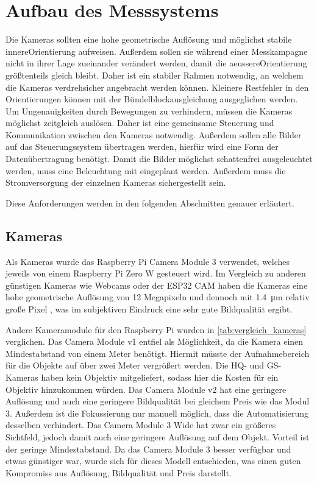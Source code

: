 \documentclass[./00PhotoBox.tex]{subfiles}
\begin{document}
\chapter{Aufbau des Messsystems}
Die Kameras sollten eine hohe geometrische Auflösung und möglichst stabile \gls{innereOrientierung} aufweisen. Außerdem sollen sie während einer Messkampagne nicht in ihrer Lage zueinander verändert werden, damit die \gls{aeussereOrientierung} größtenteils gleich bleibt. Daher ist ein stabiler Rahmen notwendig, an welchem die Kameras verdrehsicher angebracht werden können. Kleinere Restfehler in den Orientierungen können mit der Bündelblockausgleichung ausgeglichen werden.
Um Ungenauigkeiten durch Bewegungen zu verhindern, müssen die Kameras möglichst zeitgleich auslösen. Daher ist eine gemeinsame Steuerung und Kommunikation zwischen den Kameras notwendig. Außerdem sollen alle Bilder auf das Steuerungssystem übertragen werden, hierfür wird eine Form der Datenübertragung benötigt. Damit die Bilder möglichst schattenfrei ausgeleuchtet werden, muss eine Beleuchtung mit eingeplant werden. Außerdem muss die Stromversorgung der einzelnen Kameras sichergestellt sein.

Diese Anforderungen werden in den folgenden Abschnitten genauer erläutert.

\section{Kameras}
\label{s:kameras}
Als Kameras wurde das Raspberry Pi Camera Module 3 verwendet, welches jeweils von einem Raspberry Pi Zero W gesteuert wird. Im Vergleich zu anderen günstigen Kameras wie Webcams oder der ESP32 CAM haben die Kameras eine hohe geometrische Auflösung von 12 Megapixeln und dennoch mit \SI{1,4}{\micro\metre} relativ große Pixel \citep{raspicamdatasheet}, was im subjektiven Eindruck eine sehr gute Bildqualität ergibt.

Andere Kameramodule für den Raspberry Pi wurden in \autoref{tab:vergleich_kameras} verglichen. Das Camera Module v1 entfiel als Möglichkeit, da die Kamera einen Mindestabstand von einem Meter benötigt. Hiermit müsste der Aufnahmebereich für die Objekte auf über zwei Meter vergrößert werden. Die HQ- und GS-Kameras haben kein Objektiv mitgeliefert, sodass hier die Kosten für ein Objektiv hinzukommen würden. Das Camera Module v2 hat eine geringere Auflösung und auch eine geringere Bildqualität bei gleichem Preis wie das Modul 3. Außerdem ist die Fokussierung nur manuell möglich, dass die Automatisierung desselben verhindert. Das Camera Module 3 Wide hat zwar ein größeres Sichtfeld, jedoch damit auch eine geringere Auflösung auf dem Objekt. Vorteil ist der geringe Mindestabstand. Da das Camera Module 3 besser verfügbar und etwas günstiger war, wurde sich für dieses Modell entschieden, was einen guten Kompromiss aus Auflösung, Bildqualität und Preis darstellt.
\end{document}
